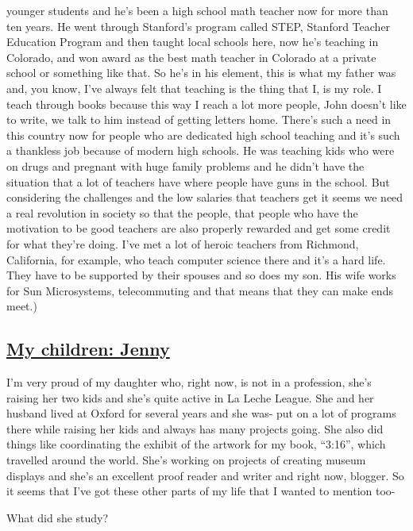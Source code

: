 \documentclass[]{article}
\begin{document}
younger students and he's been a high school math teacher now for more
than ten years. He went through Stanford's program called STEP, Stanford
Teacher Education Program and then taught local schools here, now he's
teaching in Colorado, and won award as the best math teacher in Colorado
at a private school or something like that. So he's in his element, this
is what my father was and, you know, I've always felt that teaching is
the thing that I, is my role. I teach through books because this way I
reach a lot more people, John doesn't like to write, we talk to him
instead of getting letters home. There's such a need in this country now
for people who are dedicated high school teaching and it's such a
thankless job because of modern high schools. He was teaching kids who
were on drugs and pregnant with huge family problems and he didn't have
the situation that a lot of teachers have where people have guns in the
school. But considering the challenges and the low salaries that
teachers get it seems we need a real revolution in society so that the
people, that people who have the motivation to be good teachers are also
properly rewarded and get some credit for what they're doing. I've met a
lot of heroic teachers from Richmond, California, for example, who teach
computer science there and it's a hard life. They have to be supported
by their spouses and so does my son. His wife works for Sun
Microsystems, telecommuting and that means that they can make ends
meet.)

\subsection{\texorpdfstring{\href{http://webofstories.com/play/17154}{My
children: Jenny}}{My children: Jenny}}\label{my-children-jenny}

I'm very proud of my daughter who, right now, is not in a profession,
she's raising her two kids and she's quite active in La Leche League.
She and her husband lived at Oxford for several years and she was- put
on a lot of programs there while raising her kids and always has many
projects going. She also did things like coordinating the exhibit of the
artwork for my book, ``3:16'', which travelled around the world. She's
working on projects of creating museum displays and she's an excellent
proof reader and writer and right now, blogger. So it seems that I've
got these other parts of my life that I wanted to mention too-

What did she study?
\end{document}
